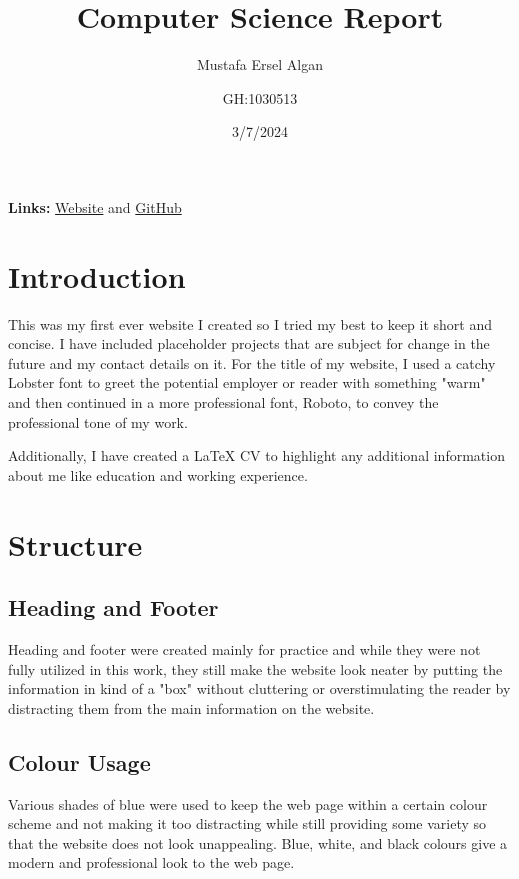 \documentclass[twoside]{article}
\title{Computer Science Report}
\author{Mustafa Ersel Algan \and GH:1030513}
\date{3/7/2024}
\begin{document}
\maketitle{}

\noindent \textbf{Links:} 
\href{https://qwersel.github.io/ersel.github.io/Ersel%20Algan%20CS%20Project/Ersel%20Algan%20HTML%20Portfolio/Computer%20Science%20Portfolio.html}{Website} 
\textnormal{ and } 
\href{https://github.com/Qwersel/ersel.github.io/tree/4c633d38ef109d9e028325fb7ee654e1b4a1144e/Ersel%20Algan%20CS%20Project}{GitHub}

\section*{Introduction}
This was my first ever website I created so I tried my best to keep it short and concise. I have included placeholder projects that are subject for change in the future and my contact details on it. For the title of my website, I used a catchy Lobster font to greet the potential employer or reader with something "warm" and then continued in a more professional font, Roboto, to convey the professional tone of my work.

\vspace{1em}

\noindent Additionally, I have created a LaTeX CV to highlight any additional information about me like education and working experience.

\section*{Structure}
\subsection*{Heading and Footer}
Heading and footer were created mainly for practice and while they were not fully utilized in this work, they still make the website look neater by putting the information in kind of a "box" without cluttering or overstimulating the reader by distracting them from the main information on the website.

\subsection*{Colour Usage}
Various shades of blue were used to keep the web page within a certain colour scheme and not making it too distracting while still providing some variety so that the website does not look unappealing. Blue, white, and black colours give a modern and professional look to the web page.
\end{document}
